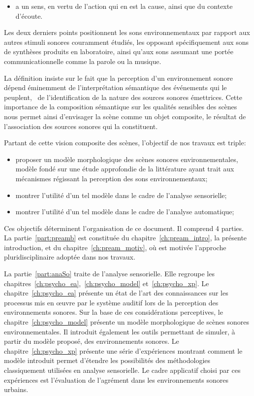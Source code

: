 \begin{itemize}
\setcounter{enumi}{2}
\item a un sens, en vertu de l'action qui en est la cause, ainsi que du contexte d'écoute.
\end{itemize}

Les deux derniers points positionnent les sons environnementaux par rapport aux autres stimuli sonores couramment étudiés, les opposant spécifiquement aux sons de synthèses produits en laboratoire, ainsi qu'aux sons assumant une portée communicationnelle comme la parole ou la musique.

La définition insiste sur le fait que la perception d'un environnement sonore dépend éminemment de l'interprétation sémantique des événements qui le peuplent, \ie~de l'identification de la nature des sources sonores émettrices. Cette importance de la composition sémantique sur les qualités sensibles des scènes nous permet ainsi d'envisager la scène comme un objet composite, le résultat de l'association des sources sonores qui la constituent.

Partant de cette vision composite des scènes, l'objectif de nos travaux est triple:

\begin{itemize}
\item proposer un modèle morphologique des scènes sonores environnementales, modèle fondé sur une étude approfondie de la littérature ayant trait aux mécanismes régissant la perception des sons environnementaux;
\item montrer l'utilité d'un tel modèle dans le cadre de l'analyse sensorielle;
\item montrer l'utilité d'un tel modèle dans le cadre de l'analyse automatique;
\end{itemize}

Ces objectifs déterminent l'organisation de ce document. Il comprend 4 parties. La partie~\ref{part:preamb} est constituée du chapitre~\ref{ch:pream_intro}, la présente introduction, et du chapitre~\ref{ch:pream_motiv}, où est motivée l'approche pluridisciplinaire adoptée dans nos travaux.

La partie~\ref{part:anaSo} traite de l'analyse sensorielle. Elle regroupe les chapitres~\ref{ch:psycho_ea},~\ref{ch:psycho_model} et~\ref{ch:psycho_xp}. Le chapitre~\ref{ch:psycho_ea} présente un état de l'art des connaissances sur les processus mis en œuvre par le système auditif lors de la perception des environnements sonores. Sur la base de ces considérations perceptives, le chapitre~\ref{ch:psycho_model} présente un modèle morphologique de scènes sonores environnementales. Il introduit également les outils permettant de simuler, à partir du modèle proposé, des environnements sonores. Le chapitre~\ref{ch:psycho_xp} présente une série d'expériences montrant comment le modèle introduit permet d'étendre les possibilités des méthodologies classiquement utilisées en analyse sensorielle. Le cadre applicatif choisi par ces expériences est l'évaluation de l'agrément dans les environnements sonores urbains.


